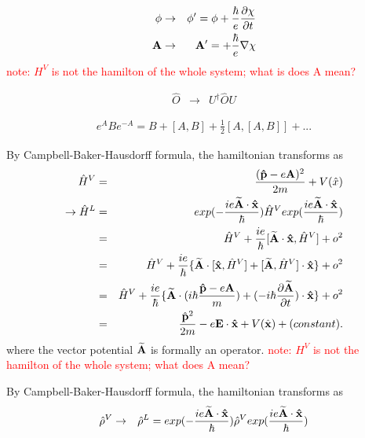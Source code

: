 \documentclass[aps,prb,preprint]{revtex4-1}
\begin{document}
\begin{appendix}
\begin{eqnarray}
\phi &\rightarrow& \phi' = \phi +\frac{\hbar}{e} \frac{\partial \chi}{\partial t} \\
{\bf A} &\rightarrow& {\bf A}' = +\frac{\hbar}{e} {\bf \nabla} \chi
\end{eqnarray} 
\textcolor{red}{note: $H^V$ is not the hamilton of the whole system; what is does A mean?}

\begin{eqnarray}
\hat{O} &\rightarrow& U^{\dag} \hat{O} U \nonumber 
\end{eqnarray} 

\begin{eqnarray}
e^A B e^{-A} = B+ [A,B] +\frac{1}{2}[A,[A,B]] + ... \nonumber  
\end{eqnarray} 

By Campbell-Baker-Hausdorff formula, the hamiltonian transforms as  
\begin{eqnarray}
\hat{H}^V &=& \frac{ ({\bf \hat{p}} - e{\bf A})^2 }{2m} + V(\hat{x}) \nonumber \nonumber \\ 
\rightarrow \hat{H}^L &=& exp(-\frac{ i e {\bf \widetilde{A} \cdot \hat{x}} }{\hbar}) \hat{H}^V exp( \frac{ i e {\bf \widetilde{A} \cdot \hat{x}}}{\hbar}) \nonumber \\
&=& \hat{H}^V + \frac{i e}{\hbar}[{\bf \widetilde{A} \cdot \hat{x} }, \hat{H}^V] + o^2 \nonumber \\
&=& \hat{H}^V + \frac{i e}{\hbar} \{ {\bf \widetilde{A}} \cdot [ {\bf \hat{x} }, \hat{H}^V] + [ {\bf \widetilde{A}} , \hat{H}^V] \cdot {\bf \hat{x} } \}+ o^2 \nonumber \\
&=& \hat{H}^V + \frac{i e}{\hbar} \{ {\bf \widetilde{A}} \cdot (i \hbar \frac{{\bf \hat{p}} - e{\bf A}}{m}) + (- i \hbar \frac{\partial \widetilde{\bf A}}{\partial t}) \cdot {\bf \hat{x} } \}+ o^2 \nonumber \\
&=& \frac{ \hat{\bf p}^2 }{2m} -e {\bf E \cdot \hat{\bf x}} + V(\hat{\bf x})+ (constant).\nonumber \\
\end{eqnarray} 
where the vector potential ${\bf \widetilde{A}}$ is formally an operator. 
\textcolor{red}{note: $H^V$ is not the hamilton of the whole system; what does A mean?}

By Campbell-Baker-Hausdorff formula, the hamiltonian transforms as  
\begin{eqnarray}
\hat{\rho}^V &\rightarrow& \hat{\rho}^L =exp(-\frac{ i e {\bf \widetilde{A} \cdot \hat{x}} }{\hbar}) \hat{\rho}^V exp( \frac{ i e {\bf \widetilde{A} \cdot \hat{x}}}{\hbar}) \nonumber \\
\end{eqnarray} 


\end{appendix}
\end{document}
